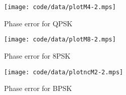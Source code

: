 \documentclass[journal]{IEEEtran}
\begin{document}


\begin{figure}[tp]
	\centering
		\texttt{[image: code/data/plotM4-2.mps]}
		\caption{Phase error for QPSK}
		\label{fig:plotphase}
\end{figure}




\begin{figure}[tp]
	\centering
		\texttt{[image: code/data/plotM8-2.mps]}
		\caption{Phase error for 8PSK}
		\label{fig:plotphase}
\end{figure}





\begin{figure}[tp]
	\centering
		\texttt{[image: code/data/plotncM2-2.mps]}
		\caption{Phase error for BPSK}
		\label{fig:plotphase}
\end{figure}

\end{document}
